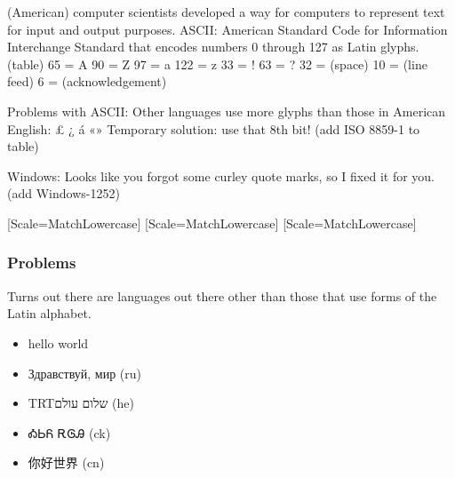 \documentclass[smaller,xcolor=table,aspectratio=169]{beamer}
\begin{document}
\begin{frame}[plain]
  (American) computer scientists developed a way for computers to represent text for input and output purposes.
  ASCII: American Standard Code for Information Interchange
  Standard that encodes numbers 0 through 127 as Latin glyphs.
  (table)
  65 = A
  90 = Z
  97 = a
  122 = z
  33 = !
  63 = ?
  32 = (space)
  10 = (line feed)
  6 = (acknowledgement)
\end{frame}

\begin{frame}[plain]
  Problems with ASCII:
  Other languages use more glyphs than those in American English:
  £
  ¿
  á
  «»
  Temporary solution: use that 8th bit!
  (add ISO 8859-1 to table)
\end{frame}

\begin{frame}[plain]
  Windows:  Looks like you forgot some curley quote marks, so I fixed it for you.
  (add Windows-1252)
\end{frame}

\newfontface{}[Scale=MatchLowercase]
\newfontface{}[Scale=MatchLowercase]
\newfontface{}[Scale=MatchLowercase]
\newcommand{\hebtxt}[1]%
    {\bgroup\textdir TRT\hebfont #1\egroup}

\begin{frame}
  \frametitle{Problems}
  Turns out there are languages out there other than those that use forms of the Latin alphabet.
  \begin{itemize}
    \item hello world
    \item Здравствуй, мир (ru)
    \item \hebtxt{שלום עולם} (he)
    \item {\chkfont ᎣᏏᏲ ᎡᎶᎯ} (ck)
    \item {\chnfont 你好世界} (cn)
  \end{itemize}
\end{frame}
\end{document}
